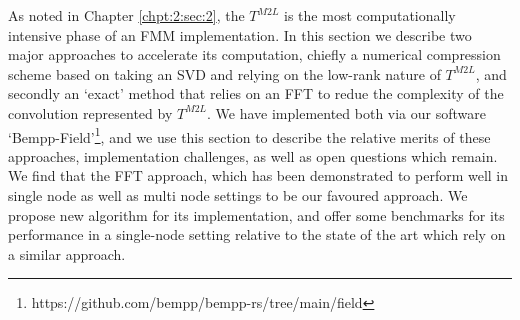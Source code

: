 As noted in Chapter \ref{chpt:2:sec:2}, the $T^{M2L}$ is the most computationally intensive phase of an FMM implementation. In this section we describe two major approaches to accelerate its computation, chiefly a numerical compression scheme based on taking an SVD and relying on the low-rank nature of $T^{M2L}$, and secondly an `exact' method that relies on an FFT to redue the complexity of the convolution represented by $T^{M2L}$. We have implemented both via our software `Bempp-Field'\footnote{https://github.com/bempp/bempp-rs/tree/main/field}, and we use this section to describe the relative merits of these approaches, implementation challenges, as well as open questions which remain. We find that the FFT approach, which has been demonstrated to perform well in single node \cite{wang2021exafmm} as well as multi node \cite{malhotra2015pvfmm} settings to be our favoured approach. We propose new algorithm for its implementation, and offer some benchmarks for its performance in a single-node setting relative to the state of the art \cite{wang2021exafmm,malhotra2015pvfmm} which rely on a similar approach.


